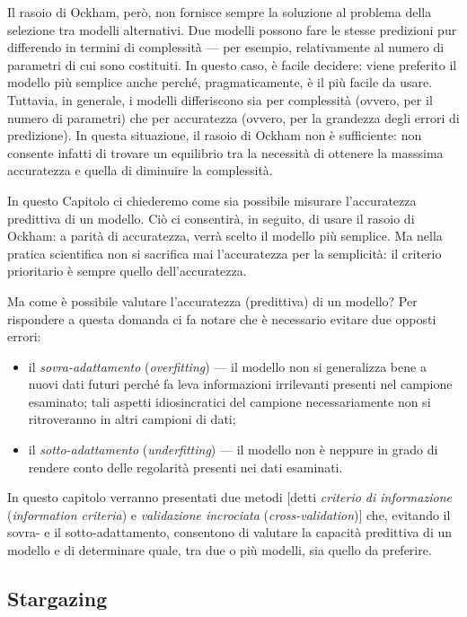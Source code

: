 \documentclass[
  10pt,
  italian,
  a4paper,
  extrafontsizes,onecolumn,openright
  ]{memoir}
\newlength{\rf}
\theoremstyle{definition}
\theoremstyle{definition}
\theoremstyle{definition}
\theoremstyle{definition}
\theoremstyle{remark}
\begin{document}
Il rasoio di Ockham, però, non fornisce sempre la soluzione al problema della selezione tra modelli alternativi. Due modelli possono fare le stesse predizioni pur differendo in termini di complessità --- per esempio, relativamente al numero di parametri di cui sono costituiti. In questo caso, è facile decidere: viene preferito il modello più semplice anche perché, pragmaticamente, è il più facile da usare. Tuttavia, in generale, i modelli differiscono sia per complessità (ovvero, per il numero di parametri) che per accuratezza (ovvero, per la grandezza degli errori di predizione). In questa situazione, il rasoio di Ockham non è sufficiente: non consente infatti di trovare un equilibrio tra la necessità di ottenere la masssima accuratezza e quella di diminuire la complessità.

In questo Capitolo ci chiederemo come sia possibile misurare l'accuratezza predittiva di un modello. Ciò ci consentirà, in seguito, di usare il rasoio di Ockham: a parità di accuratezza, verrà scelto il modello più semplice. Ma nella pratica scientifica non si sacrifica mai l'accuratezza per la semplicità: il criterio prioritario è sempre quello dell'accuratezza.

Ma come è possibile valutare l'accuratezza (predittiva) di un modello? Per rispondere a questa domanda \textcite{McElreath_rethinking} ci fa notare che è necessario evitare due opposti errori:

\begin{itemize}
\item
  il \emph{sovra-adattamento} (\emph{overfitting}) --- il modello non si generalizza bene a nuovi dati futuri perché fa leva informazioni irrilevanti presenti nel campione esaminato; tali aspetti idiosincratici del campione necessariamente non si ritroveranno in altri campioni di dati;
\item
  il \emph{sotto-adattamento} (\emph{underfitting}) --- il modello non è neppure in grado di rendere conto delle regolarità presenti nei dati esaminati.
\end{itemize}

In questo capitolo verranno presentati due metodi {[}detti \emph{criterio di informazione} (\emph{information criteria}) e \emph{validazione incrociata} (\emph{cross-validation}){]} che, evitando il sovra- e il sotto-adattamento, consentono di valutare la capacità predittiva di un modello e di determinare quale, tra due o più modelli, sia quello da preferire.

\hypertarget{stargazing}{%
\subsection{Stargazing}\label{stargazing}}
\end{document}
